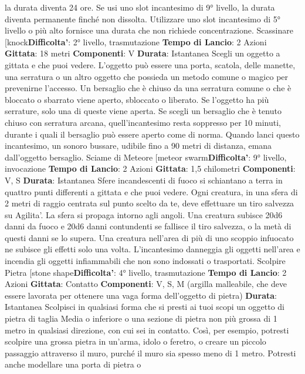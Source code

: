 \begin{multicols}{2}
la durata diventa 24 ore. Se usi uno slot incantesimo di
9° livello, la durata diventa permanente finché non
dissolta. Utilizzare uno slot incantesimo di 5° livello o
più alto fornisce una durata che non richiede
concentrazione.
Scassinare
[knock\textbf{Difficolta'}:
2° livello, trasmutazione
\textbf{Tempo di Lancio}: 2 Azioni
\textbf{Gittata}: 18 metri
\textbf{Componenti}: V
\textbf{Durata}: Istantanea
Scegli un oggetto a gittata e che puoi vedere. L’oggetto
può essere una porta, scatola, delle manette, una
serratura o un altro oggetto che possieda un metodo
comune o magico per prevenirne l’accesso.
Un bersaglio che è chiuso da una serratura comune o
che è bloccato o sbarrato viene aperto, sbloccato o
liberato. Se l’oggetto ha più serrature, solo una di
queste viene aperta.
Se scegli un bersaglio che è tenuto chiuso con
serratura arcana, quell’incantesimo resta soppresso per
10 minuti, durante i quali il bersaglio può essere aperto
come di norma.
Quando lanci questo incantesimo, un sonoro bussare,
udibile fino a 90 metri di distanza, emana dall’oggetto
bersaglio.
Sciame di Meteore
[meteor swarm\textbf{Difficolta'}:
9° livello, invocazione
\textbf{Tempo di Lancio}: 2 Azioni
\textbf{Gittata}: 1,5 chilometri
\textbf{Componenti}: V, S
\textbf{Durata}: Istantanea
Sfere incandescenti di fuoco si schiantano a terra in
quattro punti differenti a gittata e che puoi vedere. Ogni
creatura, in una sfera di 2 metri di raggio centrata sul
punto scelto da te, deve effettuare un tiro salvezza su
Agilita'. La sfera si propaga intorno agli angoli. Una
creatura subisce 20d6 danni da fuoco e 20d6 danni
contundenti se fallisce il tiro salvezza, o la metà di
questi danni se lo supera. Una creatura nell’area di più
di uno scoppio infuocato ne subisce gli effetti solo una
volta.
L’incantesimo danneggia gli oggetti nell’area e incendia
gli oggetti infiammabili che non sono indossati o
trasportati.
Scolpire Pietra
[stone shape\textbf{Difficolta'}:
4° livello, trasmutazione
\textbf{Tempo di Lancio}: 2 Azioni
\textbf{Gittata}: Contatto
\textbf{Componenti}: V, S, M (argilla malleabile, che deve
essere lavorata per ottenere una vaga forma
dell’oggetto di pietra)
\textbf{Durata}: Istantanea
Scolpisci in qualsiasi forma che si presti ai tuoi scopi un
oggetto di pietra di taglia Media o inferiore o una
sezione di pietra non più grossa di 1 metro in qualsiasi
direzione, con cui sei in contatto.
Così, per esempio, potresti scolpire una grossa pietra in
un’arma, idolo o feretro, o creare un piccolo passaggio
attraverso il muro, purché il muro sia spesso meno di
1 metro. Potresti anche modellare una porta di pietra o

\end{multicols}
